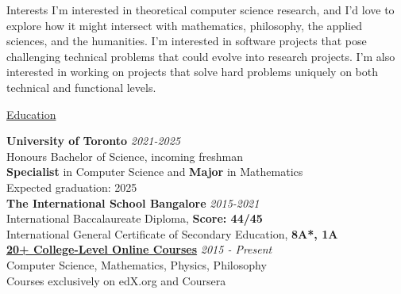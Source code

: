 \documentclass{resume} %
\begin{document}

\begin{rSection}{Interests}
    I'm interested in theoretical computer science research, and I'd love to explore how it might intersect with mathematics, philosophy, the applied sciences, and the humanities. I'm interested in software projects that pose challenging technical problems that could evolve into research projects. I'm also interested in working on projects that solve hard problems uniquely on both technical and functional levels.
\end{rSection}

\begin{rSection}{\href{ {{base_url}}\#/education }{Education}}

{\bf University of Toronto} \hfill {\em 2021-2025} \\ 
Honours Bachelor of Science, incoming freshman \\
\textbf{Specialist} in Computer Science and \textbf{Major} in Mathematics \smallskip \\
Expected graduation: 2025  \\

{\bf The International School Bangalore} \hfill {\em 2015-2021} \\ 
International Baccalaureate Diploma, \textbf{Score: 44/45}  \\
International General Certificate of Secondary Education, \textbf{8A*, 1A}\\

{\bf \href{ {{base_url}}#/education }{20+ College-Level Online Courses}} \hfill{\em 2015 - Present}\\
Computer Science, Mathematics, Physics, Philosophy  \\
Courses exclusively on edX.org and Coursera\\

\end{rSection}


\end{document}
